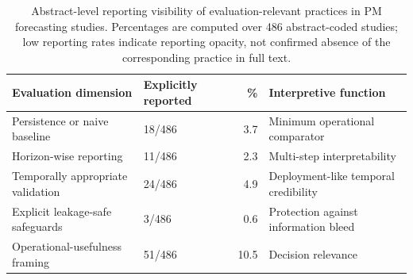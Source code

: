 \begin{table}[htbp]
\centering
\caption{Abstract-level reporting visibility of evaluation-relevant practices in PM forecasting studies. Percentages are computed over 486 abstract-coded studies; low reporting rates indicate reporting opacity, not confirmed absence of the corresponding practice in full text.}
\label{tab:prisma-reporting-audit}
\begin{tabular}{llrl}
\toprule
Evaluation dimension & Explicitly reported & \% & Interpretive function \\
\midrule
Persistence or naive baseline & 18/486 & 3.7 & Minimum operational comparator \\
Horizon-wise reporting & 11/486 & 2.3 & Multi-step interpretability \\
Temporally appropriate validation & 24/486 & 4.9 & Deployment-like temporal credibility \\
Explicit leakage-safe safeguards & 3/486 & 0.6 & Protection against information bleed \\
Operational-usefulness framing & 51/486 & 10.5 & Decision relevance \\
\bottomrule
\end{tabular}
\end{table}
